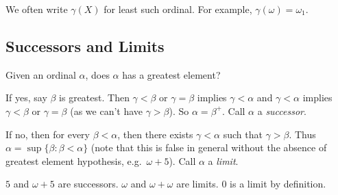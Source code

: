 \documentclass[a4paper]{article}
\begin{document}
\begin{notation}
  We often write \(\gamma(X)\) for least such ordinal. For example, \(\gamma(\omega) = \omega_1\).
\end{notation}

\subsection{Successors and Limits}

Given an ordinal \(\alpha\), does \(\alpha\) has a greatest element?

If yes, say \(\beta\) is greatest. Then \(\gamma < \beta\) or \(\gamma = \beta\) implies \(\gamma < \alpha\) and \(\gamma < \alpha\) implies \(\gamma < \beta\) or \(\gamma = \beta\) (as we can't have \(\gamma > \beta\)). So \(\alpha = \beta^+\). Call \(\alpha\) a \emph{successor}.

If no, then for every \(\beta < \alpha\), then there exists \(\gamma < \alpha\) such that \(\gamma > \beta\). Thus \(\alpha = \sup\{\beta: \beta < \alpha\}\) (note that this is false in general without the absence of greatest element hypothesis, e.g.\ \(\omega + 5\)). Call \(\alpha\) a \emph{limit}.

\begin{eg}
  \(5\) and \(\omega + 5\) are successors. \(\omega\) and \(\omega + \omega\) are limits. \(0\) is a limit by definition.
\end{eg}






\printindex

\iffalse
logic is the interplay of syntax and semantics
set: stuff with sets, universe of sets

Contents

1: Propositional logic
2: Well-ordering and ordinals
3: Posets and Zorn's Lemma
4: Predicate logic
5: Set theory
6: Cardinals

Reading:
Johnstone, Notes on logic and set theory
van Dalen, Logic and structure
Hainal & Hamburger, Set theory
Forster, Logic, induction and sets
\fi
\end{document}
